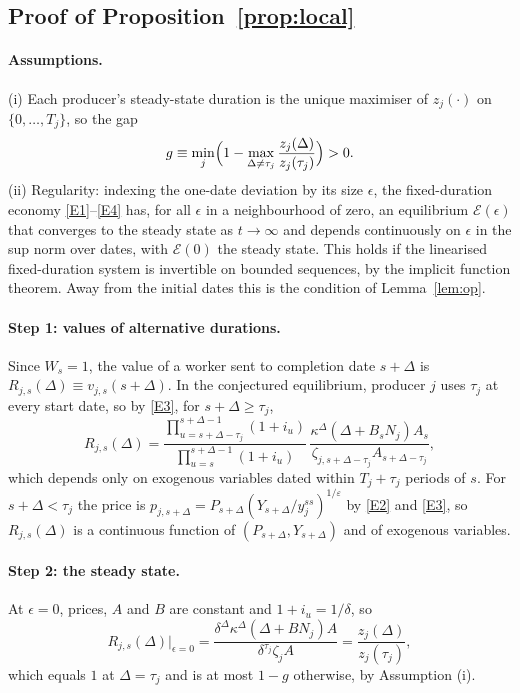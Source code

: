\documentclass[11pt]{article}
\theoremstyle{definition}
\begin{document}
\subsection{Proof of Proposition~\ref{prop:local}}\label{app:pf_local}

\paragraph{Assumptions.}
(i) Each producer's steady-state duration is the unique maximiser of $z_j(\cdot)$ on
$\{0,\dots,T_j\}$, so the gap
\[
  g\equiv\min_j\Bigl(1-\max_{\Delta\neq\tau_j}\frac{z_j(\Delta)}{z_j(\tau_j)}\Bigr)>0 .
\]
(ii) Regularity: indexing the one-date deviation by its size $\epsilon$, the fixed-duration
economy \eqref{E1}--\eqref{E4} has, for all $\epsilon$ in a neighbourhood of zero, an equilibrium
$\mathcal E(\epsilon)$ that converges to the steady state as $t\to\infty$ and depends continuously on
$\epsilon$ in the sup norm over dates, with $\mathcal E(0)$ the steady state. This holds if the
linearised fixed-duration system is invertible on bounded sequences, by the implicit function
theorem. Away from the initial dates this is the condition of Lemma~\ref{lem:op}.

\paragraph{Step 1: values of alternative durations.}
Since $W_s=1$, the value of a worker sent to completion date $s+\Delta$ is
$R_{j,s}(\Delta)\equiv v_{j,s}(s+\Delta)$. In the conjectured equilibrium, producer $j$ uses $\tau_j$
at every start date, so by \eqref{E3}, for $s+\Delta\ge\tau_j$,
\[
  R_{j,s}(\Delta)
  =\frac{\prod_{u=s+\Delta-\tau_j}^{s+\Delta-1}(1+i_u)}{\prod_{u=s}^{s+\Delta-1}(1+i_u)}\,
   \frac{\kappa^{\Delta}(\Delta+B_sN_j)A_s}{\zeta_{j,s+\Delta-\tau_j}A_{s+\Delta-\tau_j}} ,
\]
which depends only on exogenous variables dated within $T_j+\tau_j$ periods of $s$. For
$s+\Delta<\tau_j$ the price is $p_{j,s+\Delta}=P_{s+\Delta}(Y_{s+\Delta}/y_j^{ss})^{1/\varepsilon}$ by
\eqref{E2} and \eqref{E3}, so $R_{j,s}(\Delta)$ is a continuous function of $(P_{s+\Delta},Y_{s+\Delta})$
and of exogenous variables.

\paragraph{Step 2: the steady state.}
At $\epsilon=0$, prices, $A$ and $B$ are constant and $1+i_u=1/\delta$, so
\[
  R_{j,s}(\Delta)\big|_{\epsilon=0}
  =\frac{\delta^{\Delta}\kappa^{\Delta}(\Delta+BN_j)A}{\delta^{\tau_j}\zeta_jA}
  =\frac{z_j(\Delta)}{z_j(\tau_j)} ,
\]
which equals $1$ at $\Delta=\tau_j$ and is at most $1-g$ otherwise, by Assumption (i).
\end{document}
